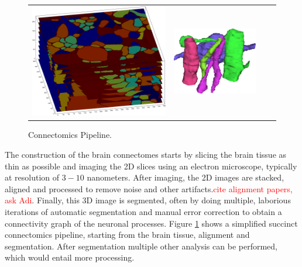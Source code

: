 \begin{figure}[htpb]
\begin{tabular}{XXXX}
	\includegraphics[height=\myheight,width=\mywidth]{data/images/segStack.png}&
	\includegraphics[height=\myheight,width=\mywidth]{data/images/seg3d.png}\\
  \end{tabular}
	\caption{Connectomics Pipeline.}
	\label{fig:connectomicsPipeline}
\end{figure}

The construction of the brain connectomes starts by slicing the brain tissue as thin as possible and imaging the 2D slices using an electron microscope, typically at resolution of $3 - 10$ nanometers. After imaging, the 2D images are stacked, aligned and processed to remove noise and other artifacts.\textcolor{red}{cite alignment papers, ask Adi}. Finally, this 3D image is segmented, often by doing multiple, laborious iterations of automatic segmentation and manual error correction to obtain a connectivity graph of the neuronal processes. Figure \ref{fig:connectomicsPipeline} shows a simplified succinct connectomics pipeline, starting from the brain tissue, alignment and segmentation. After segmentation multiple other analysis can be performed, which would entail more processing.


